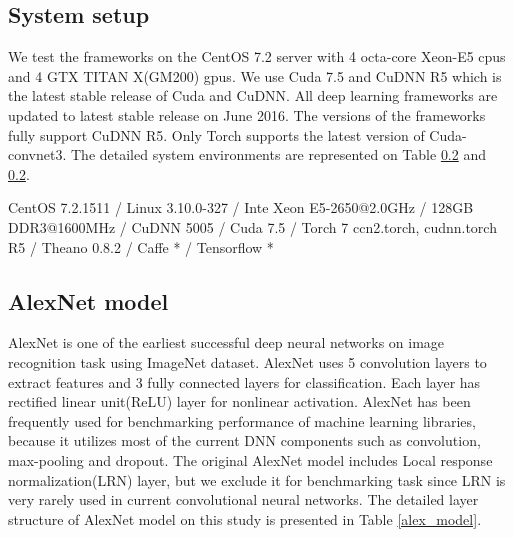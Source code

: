 \documentclass[conference]{IEEEtran}
\begin{document}
\subsection{System setup}
We test the frameworks on the CentOS 7.2 server with 4 octa-core Xeon-E5 cpus and 4 GTX TITAN X(GM200) gpus.
We use Cuda 7.5 and CuDNN R5 which is the latest stable release of Cuda and CuDNN.
All deep learning frameworks are updated to latest stable release on June 2016.
The versions of the frameworks fully support CuDNN R5.
Only Torch supports the latest version of Cuda-convnet3.
The detailed system environments are represented on Table \ref{} and \ref{}.

CentOS 7.2.1511 / Linux 3.10.0-327 / Inte Xeon E5-2650@2.0GHz / 128GB DDR3@1600MHz / CuDNN 5005 / Cuda 7.5 / Torch 7 ccn2.torch, cudnn.torch R5 / Theano 0.8.2 / Caffe * / Tensorflow *

\subsection{AlexNet model}
AlexNet \cite{krizhevsky2012imagenet} is one of the earliest successful deep neural networks on image recognition task using ImageNet dataset.
AlexNet uses 5 convolution layers to extract features and 3 fully connected layers for classification.
Each layer has rectified linear unit(ReLU) layer for nonlinear activation.
AlexNet has been frequently used for benchmarking performance of machine learning libraries, because it utilizes most of the current DNN components such as convolution, max-pooling and dropout.
The original AlexNet model includes Local response normalization(LRN) layer, but we exclude it for benchmarking task since LRN is very rarely used in current convolutional neural networks.
The detailed layer structure of AlexNet model on this study is presented in Table \ref{alex_model}.
\end{document}
